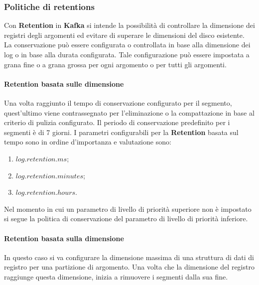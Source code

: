 \subsubsection{Politiche di retentions}
Con \textbf{Retention} in \textbf{Kafka} si intende la possibilità di controllare la dimensione dei registri
degli argomenti ed evitare di superare le dimensioni del disco esistente.\\
La conservazione può essere configurata o controllata in base alla dimensione dei \gls{log}{} o in
base alla durata configurata. Tale configurazione può essere impostata a grana fine o a
grana grossa per ogni argomento o per tutti gli argomenti.
\paragraph{Retention basata sulle dimensione}
Una volta raggiunto il tempo di conservazione configurato per il segmento, quest'ultimo viene contrassegnato per l'eliminazione o la \gls{compattazione}{} in base al criterio di pulizia configurato. Il periodo di conservazione predefinito per i segmenti è di 7 giorni.
I parametri configurabili per la \textbf{Retention} basata sul tempo sono in ordine d'importanza e valutazione sono:
\begin{enumerate}
    \item $log.retention.ms$;
    \item $log.retention.minutes$;
    \item $log.retention.hours$.
\end{enumerate}
Nel momento in cui un parametro di livello di priorità superiore non è impostato si segue la politica di conservazione del parametro di livello di priorità inferiore.\\
\paragraph{Retention basata sulla dimensione}
In questo caso si va configurare la dimensione massima di una struttura di dati di registro per una partizione di argomento. Una volta che la dimensione del registro raggiunge questa dimensione, inizia a rimuovere i segmenti dalla sua fine.\\

